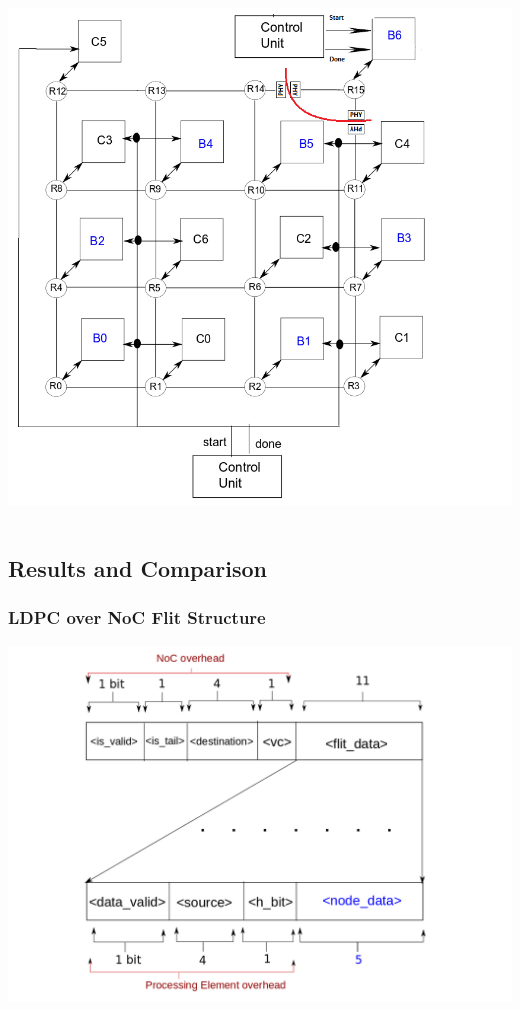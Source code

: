 \begin{frame}
\begin{columns}[c]
\begin{center}
\includegraphics[scale=0.18]{./figs/Partitioned4X4Mesh}
\end{center}
\end{columns} 
\end{frame}

\subsection{Results and Comparison}
\begin {frame}
\frametitle {LDPC over NoC Flit Structure}
\begin{center}
\includegraphics[scale=0.22]{./diagram/flit_structure_ldpc_7x7}
\end{center}

\end {frame}

